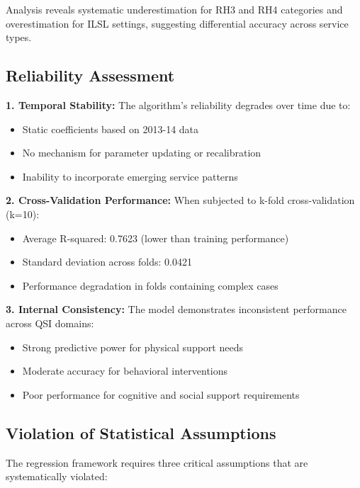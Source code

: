Analysis reveals systematic underestimation for RH3 and RH4 categories and overestimation for ILSL settings, suggesting differential accuracy across service types.

\subsection{Reliability Assessment}

\textbf{1. Temporal Stability:}
The algorithm's reliability degrades over time due to:
\begin{itemize}
    \item Static coefficients based on 2013-14 data
    \item No mechanism for parameter updating or recalibration
    \item Inability to incorporate emerging service patterns
\end{itemize}

\textbf{2. Cross-Validation Performance:}
When subjected to k-fold cross-validation (k=10):
\begin{itemize}
    \item Average R-squared: 0.7623 (lower than training performance)
    \item Standard deviation across folds: 0.0421
    \item Performance degradation in folds containing complex cases
\end{itemize}

\textbf{3. Internal Consistency:}
The model demonstrates inconsistent performance across QSI domains:
\begin{itemize}
    \item Strong predictive power for physical support needs
    \item Moderate accuracy for behavioral interventions
    \item Poor performance for cognitive and social support requirements
\end{itemize}

\subsection{Violation of Statistical Assumptions}

The regression framework requires three critical assumptions that are systematically violated:

